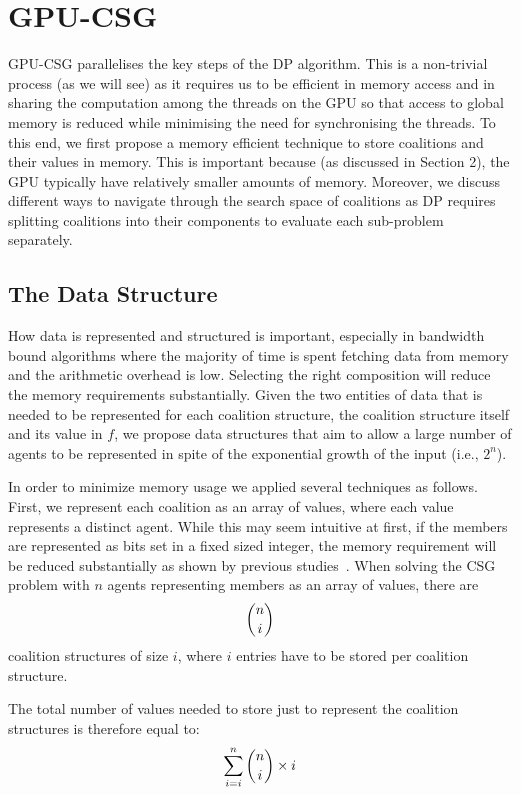 \documentclass{llncs}
\begin{document}
\section{GPU-CSG} \label{sec:gpu-csg} %
GPU-CSG parallelises the key steps of the DP algorithm. This is a non-trivial process (as we will see) as it requires us to be efficient in memory access and in sharing the computation among the threads on the GPU so that access to global memory is reduced while minimising the need for synchronising the threads. To this end, we first propose a memory efficient technique to store coalitions and their values in memory. This is important because (as discussed  in Section 2), the GPU typically have relatively smaller amounts of memory. Moreover, we discuss different ways to navigate through the search space of coalitions as DP requires splitting coalitions into their components to evaluate each sub-problem separately.
\subsection{The Data Structure}\label{sec:data}
How data is represented and structured is important,  especially in bandwidth bound algorithms where the majority of time is spent fetching data from memory and the arithmetic overhead is low.
Selecting the right composition will reduce the memory requirements substantially. Given the two entities of data that is needed to be represented for each coalition structure, the coalition structure itself and its value in $f$, we propose data structures that aim to allow a large number of agents to be represented in spite of the exponential growth of the input (i.e., $2^n$).

In order to minimize memory usage we applied several techniques as follows. First, we represent each coalition as an array of values, where each value represents a distinct agent. While this may seem intuitive at first, if the members are represented as bits set in a fixed sized integer, the memory
requirement will be reduced substantially as shown by previous studies~\cite{boyer2012solving}.
When solving the CSG problem with $n$ agents representing members as an array of values, there are \[\dbinom{n}{i}\] coalition structures of size $i$, where $i$ entries have to be stored per coalition structure.

The total number of values needed to store just to represent the coalition structures is therefore equal to:
\begin{displaymath}\sum_{i=i}^{n} \dbinom{n}{i}\times i\end{displaymath}
\end{document}
